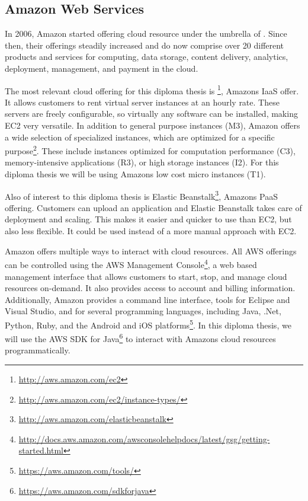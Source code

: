 \subsection{Amazon Web Services}

In 2006, Amazon started offering cloud resource under the umbrella of .
Since then, their offerings steadily increased and do now comprise over 20 different products and services for computing, data storage, content delivery, analytics, deployment, management, and payment in the cloud.

The most relevant cloud offering for this diploma thesis is \footnote{\url{http://aws.amazon.com/ec2}}, Amazons IaaS offer.
It allows customers to rent virtual server instances at an hourly rate.
These servers are freely configurable, so virtually any software can be installed, making EC2 very versatile.
In addition to general purpose instances (M3), Amazon offers a wide selection of specialized instances, which are optimized for a specific purpose\footnote{\url{http://aws.amazon.com/ec2/instance-types/}}.
These include instances optimized for computation performance (C3), memory-intensive applications (R3), or high storage instances (I2).
For this diploma thesis we will be using Amazons low cost micro instances (T1).

Also of interest to this diploma thesis is Elastic Beanstalk\footnote{\url{http://aws.amazon.com/elasticbeanstalk}}, Amazons PaaS offering.
Customers can upload an application and Elastic Beanstalk takes care of deployment and scaling.
This makes it easier and quicker to use than EC2, but also less flexible.
It could be used instead of a more manual approach with EC2.

Amazon offers multiple ways to interact with cloud resources.
All AWS offerings can be controlled using the AWS Management Console\footnote{\url{http://docs.aws.amazon.com/awsconsolehelpdocs/latest/gsg/getting-started.html}}, a web based management interface that allows customers to start, stop, and manage cloud resources on-demand.
It also provides access to account and billing information.
Additionally, Amazon provides a command line interface, tools for Eclipse and Visual Studio, and  for several programming languages, including Java, .Net, Python, Ruby, and the Android and iOS platforms\footnote{\url{https://aws.amazon.com/tools/}}.
In this diploma thesis, we will use the AWS SDK for Java\footnote{\url{https://aws.amazon.com/sdkforjava}} to interact with Amazons cloud resources programmatically.
